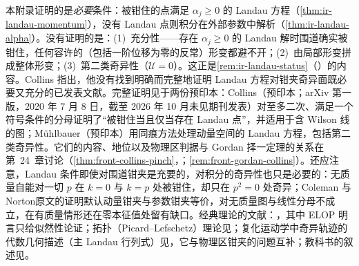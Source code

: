 本附录证明的是\emph{必要}条件：被钳住的点满足 $\alpha_j\ge0$ 的 Landau 方程（\cref{thm:ir-landau-momentum}），没有 Landau 点则积分在外部参数中解析（\cref{thm:ir-landau-alpha}）。没有证明的是：(1)~充分性——存在 $\alpha_j\ge0$ 的 Landau 解时围道确实被钳住，任何容许的（包括一阶位移为零的反常）形变都避不开；(2)~由局部形变拼成整体形变；(3)~第二类奇异性（$\mathcal U=0$）。这正是\cref{rem:ir-landau-status}（\tagA）的内容。Collins 指出，他没有找到明确而完整地证明 Landau 方程对钳夹奇异面既必要又充分的已发表文献\cite[第~5.4.3~节，第~110~页]{Collins2011}。完整证明见于两份预印本：Collins\cite{Collins:2020euz}（预印本；arXiv 第一版，2020 年 7 月 8 日，截至 2026 年 10 月未见期刊发表）对至多二次、满足一个符号条件的分母证明了“被钳住当且仅当存在 Landau 点”，并适用于含 Wilson 线的图；Mühlbauer\cite{Muhlbauer:2020kut}（预印本）用同痕方法处理动量空间的 Landau 方程，包括第二类奇异性。它们的内容、地位以及物理区判据与 Gordan 择一定理的关系在第~24~章讨论（\cref{thm:front-collins-pinch}，\tagA；\cref{rem:front-gordan-collins}）。还应注意，Landau 条件即使对围道钳夹是充要的，对积分的奇异性也只是必要的：无质量自能对一切 $p$ 在 $k=0$ 与 $k=p$ 处被钳住，却只在 $p^2=0$ 处奇异；Coleman 与 Norton\cite{ColemanNorton1965}原文的证明默认动量钳夹与参数钳夹等价，对无质量图与线性分母不成立，在有质量情形还在零本征值处留有缺口\cite[第~IV~节、附录~D]{Collins:2020euz}。经典理论的文献：\cite{Landau1959,Nakanishi:1959jzx,EdenEtAl1966}，其中 ELOP 明言只给似然性论证\cite[第~2.1~节，第~48~页]{EdenEtAl1966}；拓扑（Picard--Lefschetz）理论见\cite{Pham:2011SingInt}；复化运动学中奇异轨迹的代数几何描述（主 Landau 行列式）见\cite{Fevola:2023kaw}，它与物理区钳夹的问题互补；教科书的叙述见\cite[第~13~章]{Sterman1993}。
